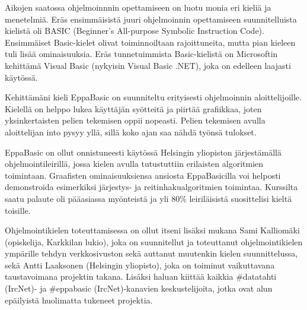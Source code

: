 Aikojen saatossa ohjelmoinnnin opettamiseen
on luotu monia eri kieliä ja menetelmiä.
Eräs ensimmäisistä juuri ohjelmoinnin opettamiseen
suunnitelluista kielistä oli BASIC
(Beginner's All-purpose Symbolic Instruction Code).
Ensimmäiset Basic-kielet olivat toiminnoiltaan rajoittuneita,
mutta pian kieleen tuli lisää ominaisuuksia.
Eräs tunnetuimmista Basic-kielistä on
Microsoftin kehittämä Visual Basic
(nykyisin Visual Basic .NET),
joka on edelleen laajasti käytössä.

Kehittämäni kieli EppaBasic on suunniteltu
erityisesti ohjelmoinnin aloittelijoille.
Kielellä on helppo lukea käyttäjän syötteitä
ja piirtää grafiikkaa,
joten yksinkertaisten pelien tekemisen oppii nopeasti.
Pelien tekemisen avulla aloittelijan into pysyy yllä,
sillä koko ajan saa nähdä työnsä tulokset.

EppaBasic on ollut onnistuneesti käytössä
Helsingin yliopiston järjestämällä ohjelmointileirillä,
jossa kielen avulla tutustuttiin erilaisten algoritmien toimintaan.
Graafisten ominaisuuksiensa ansiosta
EppaBasicilla voi helposti demonstroida
esimerkiksi järjestys- ja reitinhakualgoritmien toimintaa.
Kurssilta saatu palaute oli pääasiassa myönteistä
ja yli 80\% leiriläisistä suosittelisi kieltä toisille.

Ohjelmointikielen toteuttamisessa on ollut itseni lisäksi mukana
Sami Kalliomäki (opiskelija, Karkkilan lukio),
joka on suunnitellut ja toteuttanut ohjelmointikielen ympärille tehdyn verkkosivuston
sekä auttanut muutenkin kielen suunnittelussa,
sekä Antti Laaksonen (Helsingin yliopisto),
joka on toiminut vaikuttavana taustavoimana projektin takana.
Lisäksi haluan kiittää kaikkia \#datatahti (IrcNet)- ja \#eppabasic (IrcNet)-kanavien keskustelijoita,
jotka ovat alun epäilyistä huolimatta tukeneet projektia.


%
